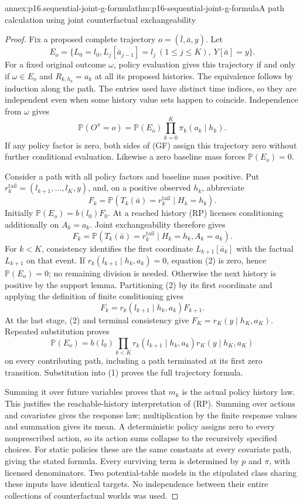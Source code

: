 \begin{annexitem}{annex:p16.sequential-joint-g-formula}{thm:p16-sequential-joint-g-formula}{A path calculation using joint counterfactual exchangeability}
\begin{proof}
Fix a proposed complete trajectory \(o=(\bar l,\bar a,y)\). Let
\[
 E_o=\{L_0=l_0, L_j[\bar a_{j-1}]=l_j\ (1\leq j\leq K),
                         \ Y[\bar a]=y\}.
\]
For a fixed original outcome \(\omega\), policy evaluation gives this
trajectory if and only if \(\omega\in E_o\) and
\(R_{k,h_k}=a_k\) at all its proposed histories. The equivalence follows
by induction along the path. The entries used have distinct time indices,
so they are independent even when some history value sets happen to
coincide. Independence from \(\omega\) gives
\[
 \mathbb P(O^\pi=o)=\mathbb P(E_o)\prod_{k=0}^K\pi_k(a_k\mid h_k).
 \tag{1}
\]
If any policy factor is zero, both sides of (GF) assign this trajectory
zero without further conditional evaluation. Likewise a zero baseline
mass forces \(\mathbb P(E_o)=0\).

Consider a path with all policy factors and baseline mass positive. Put
\(r^{\mathrm{tail}}_k=(l_{k+1},\ldots,l_K,y)\), and, on a positive
observed \(h_k\), abbreviate
\[
 F_k=\mathbb P(T_k(\bar a)=r^{\mathrm{tail}}_k\mid H_k=h_k).
\]
Initially \(\mathbb P(E_o)=b(l_0)F_0\). At a reached history (RP)
licenses conditioning additionally on \(A_k=a_k\). Joint exchangeability
therefore gives
\[
 F_k=\mathbb P(T_k(\bar a)=r^{\mathrm{tail}}_k
                                      \mid H_k=h_k,A_k=a_k).
 \tag{2}
\]
For \(k<K\), consistency identifies the first coordinate
\(L_{k+1}[\bar a_k]\) with the factual \(L_{k+1}\) on that event.
If \(r_k(l_{k+1}\mid h_k,a_k)=0\), equation (2) is zero, hence
\(\mathbb P(E_o)=0\); no remaining division is needed. Otherwise the
next history is positive by the support lemma. Partitioning (2) by its
first coordinate and applying the definition of finite conditioning gives
\[
 F_k=r_k(l_{k+1}\mid h_k,a_k)F_{k+1}.               \tag{3}
\]
At the last stage, (2) and terminal consistency give
\(F_K=r_K(y\mid h_K,a_K)\). Repeated substitution proves
\[
 \mathbb P(E_o)=b(l_0)\prod_{k<K}r_k(l_{k+1}\mid h_k,a_k)
                                      r_K(y\mid h_K,a_K)
\]
on every contributing path, including a path terminated at its first zero
transition. Substitution into (1) proves the full trajectory formula.

Summing it over future variables proves that \(m_k\) is the actual policy
history law. This justifies the reachable-history interpretation of (RP).
Summing over actions and covariates gives the response law; multiplication
by the finite response values and summation gives its mean. A deterministic
policy assigns zero to every nonprescribed action, so its action sums
collapse to the recursively specified choices. For static policies these
are the same constants at every covariate path, giving the stated formula.
Every surviving term is determined by \(p\) and \(\pi\), with licensed
denominators. Two potential-table models in the stipulated class sharing
these inputs have identical targets. No independence between their entire
collections of counterfactual worlds was used.


\end{proof}
\end{annexitem}
